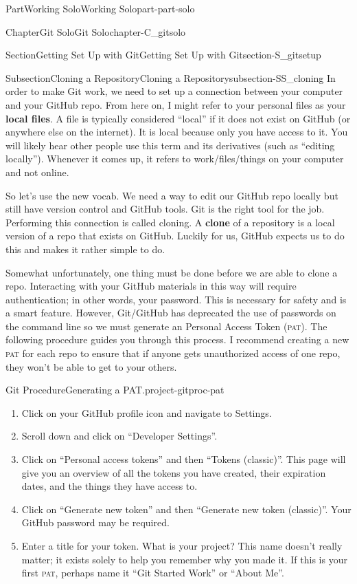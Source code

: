 \documentclass[oneside,10pt,]{book}
\newcommand{\acronym}[1]{\textsc{\MakeLowercase{#1}}}
\DeclareRobustCommand{\acronymintitle}[1]{\texorpdfstring{#1}{#1}}
\newcommand{\terminology}[1]{\textbf{#1}}
\begin{document}
\begin{partptx}{Part}{Working Solo}{}{Working Solo}{}{}{part-part-solo}
\begin{chapterptx}{Chapter}{Git Solo}{}{Git Solo}{}{}{chapter-C_gitsolo}
\begin{sectionptx}{Section}{Getting Set Up with Git}{}{Getting Set Up with Git}{}{}{section-S_gitsetup}
\begin{subsectionptx}{Subsection}{Cloning a Repository}{}{Cloning a Repository}{}{}{subsection-SS_cloning}
%
%
%
%
%
In order to make Git work, we need to set up a connection between your computer and your GitHub repo. From here on, I might refer to your personal files as your \terminology{local files}. A file is typically considered ``local'' if it does not exist on GitHub (or anywhere else on the internet). It is local because only you have access to it. You will likely hear other people use this term and its derivatives (such as ``editing locally''). Whenever it comes up, it refers to work\slash{}files\slash{}things on your computer and not online.%
\par
So let's use the new vocab. We need a way to edit our GitHub repo locally but still have version control and GitHub tools. Git is the right tool for the job. Performing this connection is called cloning. A \terminology{clone} of a repository is a local version of a repo that exists on GitHub. Luckily for us, GitHub expects us to do this and makes it rather simple to do.%
\par
Somewhat unfortunately, one thing must be done before we are able to clone a repo. Interacting with your GitHub materials in this way will require authentication; in other words, your password. This is necessary for safety and is a smart feature. However, Git\slash{}GitHub has deprecated the use of passwords on the command line so we must generate an Personal Access Token (\acronym{PAT}). The following procedure guides you through this process. I recommend creating a new \acronym{PAT} for each repo to ensure that if anyone gets unauthorized access of one repo, they won't be able to get to your others.%
\begin{project}{Git Procedure}{Generating a \acronymintitle{PAT}.}{project-gitproc-pat}%
\index{github!\acronym{PAT}}%
\begin{enumerate}[font=\bfseries,label=(\alph*),ref=\alph*]%
\item{}Click on your GitHub profile icon and navigate to Settings.%
\item{}Scroll down and click on ``Developer Settings''.%
\item{}Click on ``Personal access tokens'' and then ``Tokens (classic)''. This page will give you an overview of all the tokens you have created, their expiration dates, and the things they have access to.%
\item{}Click on ``Generate new token'' and then ``Generate new token (classic)''. Your GitHub password may be required.%
\item{}Enter a title for your token. What is your project? This name doesn't really matter; it exists solely to help you remember why you made it. If this is your first \acronym{PAT}, perhaps name it ``Git Started Work'' or ``About Me''.%

\end{enumerate}
\end{project}
\end{subsectionptx}
\end{sectionptx}
\end{chapterptx}
\end{partptx}
\end{document}
